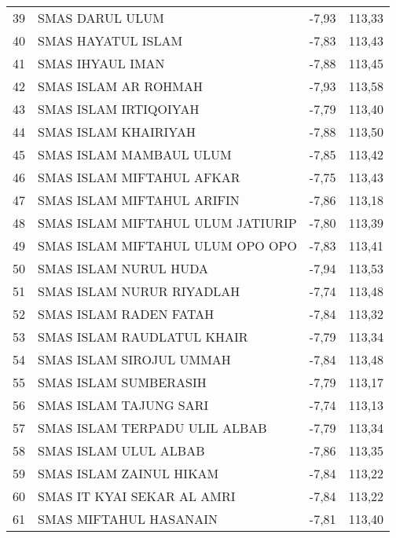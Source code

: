 {\begin{longtable}[c]{clcc}
\rowcolor[HTML]{D9E1F2} 
39 & SMAS DARUL ULUM                       & -7,93 & 113,33 \\
40 & SMAS   HAYATUL ISLAM                  & -7,83 & 113,43 \\
\rowcolor[HTML]{D9E1F2} 
41 & SMAS IHYAUL IMAN                      & -7,88 & 113,45 \\
42 & SMAS   ISLAM AR ROHMAH                & -7,93 & 113,58 \\
\rowcolor[HTML]{D9E1F2} 
43 & SMAS ISLAM IRTIQOIYAH                 & -7,79 & 113,40 \\
44 & SMAS   ISLAM KHAIRIYAH                & -7,88 & 113,50 \\
\rowcolor[HTML]{D9E1F2} 
45 & SMAS ISLAM MAMBAUL ULUM               & -7,85 & 113,42 \\
46 & SMAS   ISLAM MIFTAHUL AFKAR           & -7,75 & 113,43 \\
\rowcolor[HTML]{D9E1F2} 
47 & SMAS ISLAM MIFTAHUL ARIFIN            & -7,86 & 113,18 \\
48 & SMAS   ISLAM MIFTAHUL ULUM JATIURIP   & -7,80 & 113,39 \\
\rowcolor[HTML]{D9E1F2} 
49 & SMAS ISLAM MIFTAHUL ULUM OPO OPO      & -7,83 & 113,41 \\
50 & SMAS   ISLAM NURUL HUDA               & -7,94 & 113,53 \\
\rowcolor[HTML]{D9E1F2} 
51 & SMAS ISLAM NURUR RIYADLAH             & -7,74 & 113,48 \\
52 & SMAS   ISLAM RADEN FATAH              & -7,84 & 113,32 \\
\rowcolor[HTML]{D9E1F2} 
53 & SMAS ISLAM RAUDLATUL KHAIR            & -7,79 & 113,34 \\
54 & SMAS   ISLAM SIROJUL UMMAH            & -7,84 & 113,48 \\
\rowcolor[HTML]{D9E1F2} 
55 & SMAS ISLAM SUMBERASIH                 & -7,79 & 113,17 \\
56 & SMAS   ISLAM TAJUNG SARI              & -7,74 & 113,13 \\
\rowcolor[HTML]{D9E1F2} 
57 & SMAS ISLAM TERPADU ULIL ALBAB         & -7,79 & 113,34 \\
58 & SMAS   ISLAM ULUL ALBAB               & -7,86 & 113,35 \\
\rowcolor[HTML]{D9E1F2} 
59 & SMAS ISLAM ZAINUL HIKAM               & -7,84 & 113,22 \\
60 & SMAS IT   KYAI SEKAR AL AMRI          & -7,84 & 113,22 \\
\rowcolor[HTML]{D9E1F2} 
61 & SMAS MIFTAHUL HASANAIN                & -7,81 & 113,40 \\

\end{longtable}}
